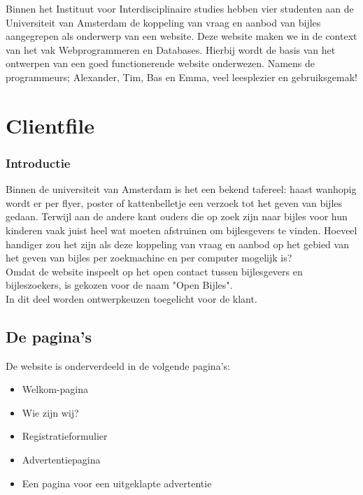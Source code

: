 \documentclass{report}
\begin{document}
        Binnen het Instituut voor Interdisciplinaire studies hebben vier studenten aan de Universiteit van Amsterdam de koppeling van vraag en aanbod van bijles aangegrepen als onderwerp van een website. Deze website maken we in de context van het vak Webprogrammeren en Databases. Hierbij wordt de basis van het ontwerpen van een goed functionerende website onderwezen. Namens de programmeurs; Alexander, Tim, Bas en Emma, veel leesplezier en gebruiksgemak!

    \chapter{Clientfile}
        \subsection*{Introductie}
            Binnen de universiteit van Amsterdam is het een bekend tafereel: haast wanhopig wordt er per flyer, poster of kattenbelletje een verzoek tot het geven van bijles gedaan. Terwijl aan de andere kant ouders die op zoek zijn naar bijles voor hun kinderen vaak juist heel wat moeten afstruinen om bijlesgevers te vinden. Hoeveel handiger zou het zijn als deze koppeling van vraag en aanbod op het gebied van het geven van bijles per zoekmachine en per computer mogelijk is? \\
            
            Omdat de website inspeelt op het open contact tussen bijlesgevers en bijleszoekers, is gekozen voor de naam "Open Bijles".\\
        
            In dit deel worden ontwerpkeuzen toegelicht voor de klant.\\

        \section{De pagina's}
            De website is onderverdeeld in de volgende pagina's:
            \begin{itemize}
                \item Welkom-pagina
                \item Wie zijn wij?
                \item Registratieformulier
                \item Advertentiepagina
                \item Een pagina voor een uitgeklapte advertentie
            \end{itemize}
            
\end{document}
